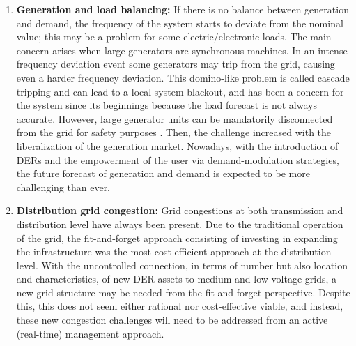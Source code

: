\begin{enumerate}
\item \textbf{Generation and load balancing:} If there is no balance between generation and demand, the frequency of the system starts to deviate from the nominal value; this may be a problem for some electric/electronic loads. The main concern arises when large generators are synchronous machines. In an intense frequency deviation event some generators may trip from the grid, causing even a harder frequency deviation. This domino-like problem is called cascade tripping and can lead to a local system blackout, and has been a concern for the system since its beginnings because the load forecast is not always accurate. However, large generator units can be mandatorily disconnected from the grid for safety purposes \cite{Bollen2011}. Then, the challenge increased with the liberalization of the generation market. Nowadays, with the introduction of DERs and the empowerment of the user via demand-modulation strategies, the future forecast of generation and demand is expected to be more challenging than ever.

\item \textbf{Distribution grid congestion:} Grid congestions at both transmission and distribution level have always been present. Due to the traditional operation of the grid, the fit-and-forget approach consisting of investing in expanding the infrastructure was the most cost-efficient approach at the distribution level. With the uncontrolled connection, in terms of number but also location and characteristics, of new DER assets to medium and low voltage grids, a new grid structure may be needed from the fit-and-forget perspective. Despite this, this does not seem either rational nor cost-effective viable, and instead, these new congestion challenges will need to be addressed from an active (real-time) management approach.
\end{enumerate}


